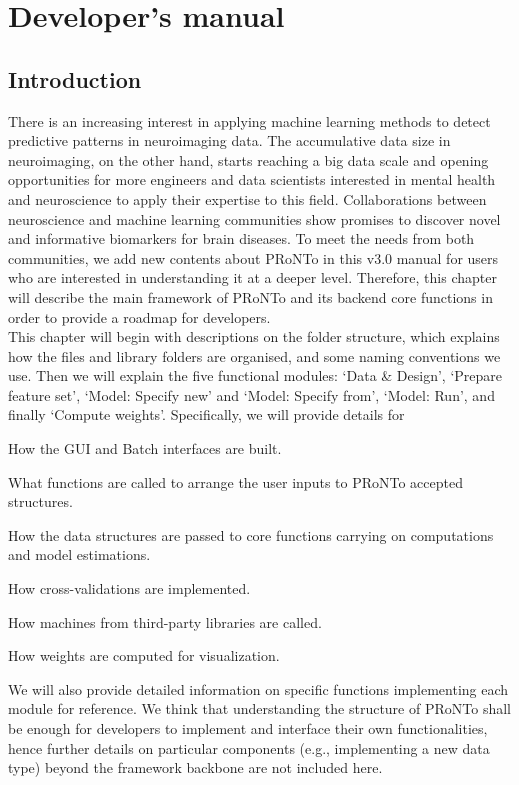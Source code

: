 
\chapter{Developer's manual}
\label{developers_manual}
\minitoc

\section{Introduction}

There is an increasing interest in applying machine learning methods to detect predictive patterns in neuroimaging data. The accumulative data size in neuroimaging, on the other hand, starts reaching a big data scale and opening opportunities for more engineers and data scientists interested in mental health and neuroscience to apply their expertise to this field. Collaborations between neuroscience and machine learning communities show promises to discover novel and informative biomarkers for brain diseases. To meet the needs from both communities, we add new contents about PRoNTo in this v3.0 manual for users who are interested in understanding it at a deeper level. Therefore, this chapter will describe the main framework of PRoNTo and its backend core functions in order to provide a roadmap for developers.
\\

This chapter will begin with descriptions on the folder structure, which explains how the files and library folders are organised, and some naming conventions we use. Then we will explain the five functional modules: `Data \& Design', `Prepare feature set', `Model: Specify new' and `Model: Specify from', `Model: Run', and finally `Compute weights'. Specifically, we will provide details for

\bi
\item How the GUI and Batch interfaces are built.
\item What functions are called to arrange the user inputs to PRoNTo accepted structures.
\item How the data structures are passed to core functions carrying on computations and model estimations.
\item How cross-validations are implemented.
\item How machines from third-party libraries are called.
\item How weights are computed for visualization.
\ei

We will also provide detailed information on specific functions implementing each module for reference. We think that understanding the structure of PRoNTo shall be enough for developers to implement and interface their own functionalities, hence further details on  particular components (e.g., implementing a new data type) beyond the framework backbone are not included here. 


